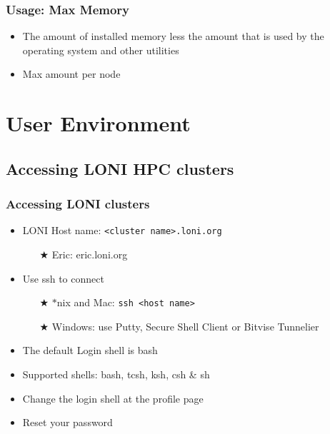 \documentclass[slidestop,mathserif,compress,xcolor=svgnames,table]{beamer}
\begin{document}
\begin{frame}
  \frametitle{\small Usage: Max Memory}
  \begin{itemize}
    \item The amount of installed memory less the amount that is used by the operating system and other utilities 
    \item Max amount per node
  \end{itemize}
\end{frame}


\section{User Environment}
\subsection{Accessing LONI HPC clusters}
\begin{frame}
  \frametitle{\small Accessing LONI clusters}
  \begin{itemize}
    \item LONI Host name: \texttt{<cluster name>.loni.org}
    \begin{itemize}
      \item[$\bigstar$] Eric: eric.loni.org
    \end{itemize}
    \item Use ssh to connect
    \begin{itemize}
      \item[$\bigstar$] $\ast$nix and Mac: \texttt{ssh <host name>}
      \item[$\bigstar$] Windows: use Putty, Secure Shell Client or Bitvise Tunnelier
    \end{itemize}
    \item The default Login shell is bash
    \item Supported shells: bash, tcsh, ksh, csh \& sh
    \item Change the login shell at the profile page
    \item Reset your password
  \end{itemize}
\end{frame}
\end{document}
